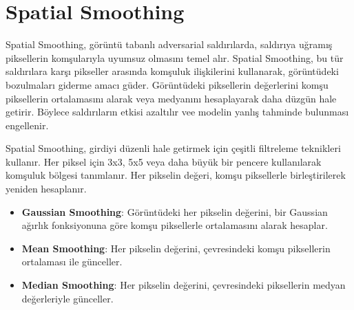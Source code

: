 \section{Spatial Smoothing}

Spatial Smoothing, görüntü tabanlı adversarial saldırılarda, saldırıya uğramış piksellerin komşularıyla uyumsuz olmasını temel alır. Spatial Smoothing, bu tür saldırılara karşı pikseller arasında komşuluk ilişkilerini kullanarak, görüntüdeki bozulmaları giderme amacı güder. Görüntüdeki piksellerin değerlerini komşu piksellerin ortalamasını alarak veya medyanını hesaplayarak daha düzgün hale getirir. Böylece saldırıların etkisi azaltılır vee modelin yanlış tahminde bulunması engellenir.

Spatial Smoothing, girdiyi düzenli hale getirmek için çeşitli filtreleme teknikleri kullanır. Her piksel için 3x3, 5x5 veya daha büyük bir pencere kullanılarak komşuluk bölgesi tanımlanır. Her pikselin değeri, komşu piksellerle birleştirilerek yeniden hesaplanır.

\begin{itemize}
    \item \textbf{Gaussian Smoothing}: Görüntüdeki her pikselin değerini, bir Gaussian ağırlık fonksiyonuna göre komşu piksellerle ortalamasını alarak hesaplar.
    \item \textbf{Mean Smoothing}: Her pikselin değerini, çevresindeki komşu piksellerin ortalaması ile günceller.
    \item \textbf{Median Smoothing}: Her pikselin değerini, çevresindeki piksellerin medyan değerleriyle günceller.
\end{itemize}

\newpage